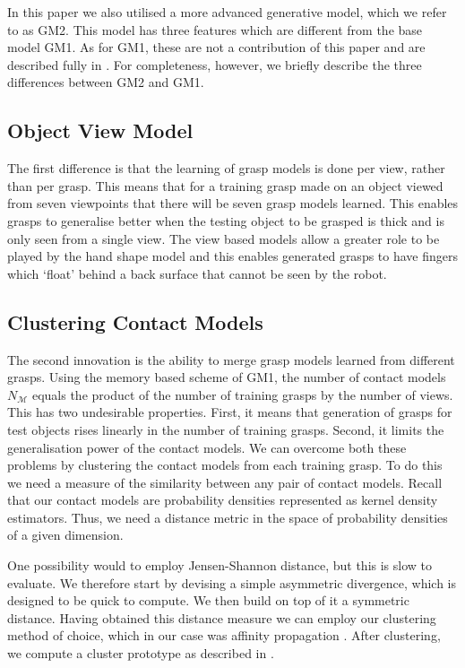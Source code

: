 
In this paper we also utilised a more advanced generative model, which we refer to as GM2. This model has three features which are different from the base model GM1. As for GM1, these are not a contribution of this paper and are described fully in \cite{kopicki2019ijrr}. For completeness, however, we briefly describe the three differences between GM2 and GM1. 

\subsection{Object View Model}\label{sec:representations.object}
The first difference is that the learning of grasp models is done per view, rather than per grasp. This means that for a training grasp made on an object viewed from seven viewpoints that there will be seven grasp models learned. This enables grasps to generalise better when the testing object to be grasped is thick and is only seen from a single view. The view based models allow a greater role to be played by the hand shape model and this enables generated grasps to have fingers which `float' behind a back surface that cannot be seen by the robot.

\subsection{Clustering Contact Models}\label{sec:learning.clustering}

The second innovation is the ability to merge grasp models learned from different grasps. Using the memory based scheme of GM1, the number of contact models $N_{\mathcal{M}}$ equals the product of the number of training grasps by the number of views. This has two undesirable properties. First, it means that generation of grasps for test objects rises linearly in the number of training grasps. Second, it limits the generalisation power of the contact models. We can overcome both these problems by clustering the contact models from each training grasp. To do this we need a measure of the similarity between any pair of contact models. Recall that our contact models are probability densities represented as kernel density estimators. Thus, we need a distance metric in the space of probability densities of a given dimension.

One possibility would to employ Jensen-Shannon distance, but this is slow to evaluate. We therefore start by devising a simple asymmetric divergence, which is designed to be quick to compute. We then build on top of it a symmetric distance. Having obtained this distance measure we can employ our clustering method of choice, which in our case was affinity propagation \cite{frey2007clustering}. After clustering, we compute a cluster prototype as described in \cite{kopicki2019}.

